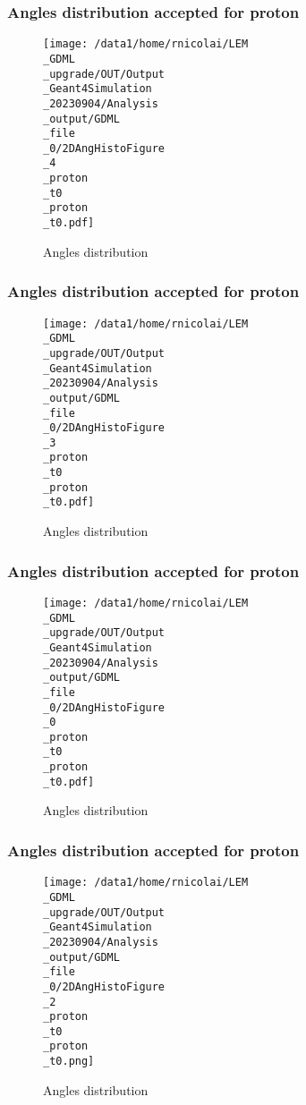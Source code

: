 \documentclass[8pt]{beamer}
\begin{document}
            \begin{frame}
                \frametitle{Angles distribution accepted for proton}
            
        \begin{figure}[h]
            \centering
            \texttt{[image: /data1/home/rnicolai/LEM\\\_GDML\\\_upgrade/OUT/Output\\\_Geant4Simulation\\\_20230904/Analysis\\\_output/GDML\\\_file\\\_0/2DAngHistoFigure\\\_4\\\_proton\\\_t0\\\_proton\\\_t0.pdf]}
            \caption{Angles distribution}
        \end{figure}
        
            \end{frame}
            
            \begin{frame}
                \frametitle{Angles distribution accepted for proton}
            
        \begin{figure}[h]
            \centering
            \texttt{[image: /data1/home/rnicolai/LEM\\\_GDML\\\_upgrade/OUT/Output\\\_Geant4Simulation\\\_20230904/Analysis\\\_output/GDML\\\_file\\\_0/2DAngHistoFigure\\\_3\\\_proton\\\_t0\\\_proton\\\_t0.pdf]}
            \caption{Angles distribution}
        \end{figure}
        
            \end{frame}
            
            \begin{frame}
                \frametitle{Angles distribution accepted for proton}
            
        \begin{figure}[h]
            \centering
            \texttt{[image: /data1/home/rnicolai/LEM\\\_GDML\\\_upgrade/OUT/Output\\\_Geant4Simulation\\\_20230904/Analysis\\\_output/GDML\\\_file\\\_0/2DAngHistoFigure\\\_0\\\_proton\\\_t0\\\_proton\\\_t0.pdf]}
            \caption{Angles distribution}
        \end{figure}
        
            \end{frame}
            
            \begin{frame}
                \frametitle{Angles distribution accepted for proton}
            
        \begin{figure}[h]
            \centering
            \texttt{[image: /data1/home/rnicolai/LEM\\\_GDML\\\_upgrade/OUT/Output\\\_Geant4Simulation\\\_20230904/Analysis\\\_output/GDML\\\_file\\\_0/2DAngHistoFigure\\\_2\\\_proton\\\_t0\\\_proton\\\_t0.png]}
            \caption{Angles distribution}
        \end{figure}
        
            \end{frame}
            
\end{document}

